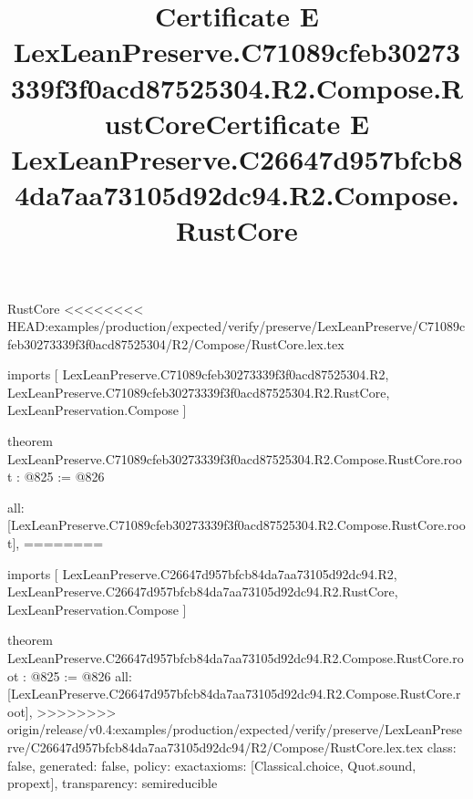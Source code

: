 \begin{lexlean}{RustCore}
<<<<<<<< HEAD:examples/production/expected/verify/preserve/LexLeanPreserve/C71089cfeb30273339f3f0acd87525304/R2/Compose/RustCore.lex.tex
\title{Certificate E LexLeanPreserve.C71089cfeb30273339f3f0acd87525304.R2.Compose.RustCore}
\begin{coremodule}
imports [
  LexLeanPreserve.C71089cfeb30273339f3f0acd87525304.R2,
  LexLeanPreserve.C71089cfeb30273339f3f0acd87525304.R2.RustCore,
  LexLeanPreservation.Compose
]

theorem LexLeanPreserve.C71089cfeb30273339f3f0acd87525304.R2.Compose.RustCore.root : @825 := @826 {
  all: [LexLeanPreserve.C71089cfeb30273339f3f0acd87525304.R2.Compose.RustCore.root],
========
\title{Certificate E LexLeanPreserve.C26647d957bfcb84da7aa73105d92dc94.R2.Compose.RustCore}
\begin{coremodule}
imports [
  LexLeanPreserve.C26647d957bfcb84da7aa73105d92dc94.R2,
  LexLeanPreserve.C26647d957bfcb84da7aa73105d92dc94.R2.RustCore,
  LexLeanPreservation.Compose
]

theorem LexLeanPreserve.C26647d957bfcb84da7aa73105d92dc94.R2.Compose.RustCore.root : @825 := @826 {
  all: [LexLeanPreserve.C26647d957bfcb84da7aa73105d92dc94.R2.Compose.RustCore.root],
>>>>>>>> origin/release/v0.4:examples/production/expected/verify/preserve/LexLeanPreserve/C26647d957bfcb84da7aa73105d92dc94/R2/Compose/RustCore.lex.tex
  class: false,
  generated: false,
  policy: exact{axioms: [Classical.choice, Quot.sound, propext]},
  transparency: semireducible
}


\end{coremodule}}
\end{coremodule}
\end{lexlean}
